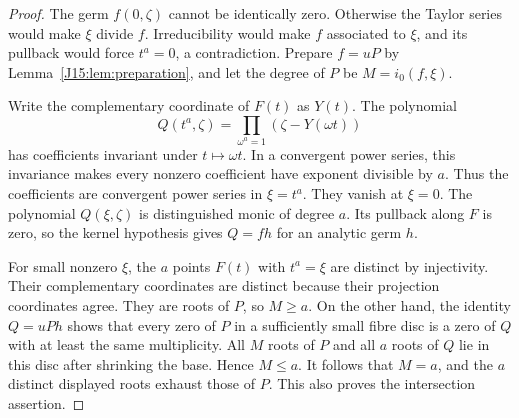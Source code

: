 \documentclass[11pt,oneside]{report}
\theoremstyle{definition}
\numberwithin{equation}{section}
\begin{document}
\begin{proof}
The germ $f(0,\zeta)$ cannot be identically zero. Otherwise the Taylor
series would make $\xi$ divide $f$. Irreducibility would make $f$
associated to $\xi$, and its pullback would force $t^a=0$, a contradiction.
Prepare $f=uP$ by Lemma~\ref{J15:lem:preparation}, and let the degree of $P$
be $M=i_0(f,\xi)$.

Write the complementary coordinate of $F(t)$ as $Y(t)$. The polynomial
\[
 Q(t^a,\zeta)=\prod_{\omega^a=1}(\zeta-Y(\omega t))
\]
has coefficients invariant under $t\mapsto\omega t$.
In a convergent power series, this invariance makes every nonzero
coefficient have exponent divisible by $a$. Thus the coefficients are
convergent power series in $\xi=t^a$. They vanish at $\xi=0$.
The polynomial $Q(\xi,\zeta)$ is distinguished monic of degree $a$.
Its pullback along $F$ is zero, so the kernel hypothesis gives $Q=fh$
for an analytic germ $h$.

For small nonzero $\xi$, the $a$ points $F(t)$ with $t^a=\xi$ are
distinct by injectivity. Their complementary coordinates are distinct
because their projection coordinates agree. They are roots of $P$, so
$M\ge a$.
On the other hand, the identity $Q=uPh$ shows that every zero of $P$
in a sufficiently small fibre disc is a zero of $Q$ with at least the
same multiplicity. All $M$ roots of $P$ and all $a$ roots of $Q$ lie
in this disc after shrinking the base. Hence $M\le a$.
It follows that $M=a$, and the $a$ distinct displayed roots exhaust
those of $P$. This also proves the intersection assertion.
\end{proof}
\end{document}

